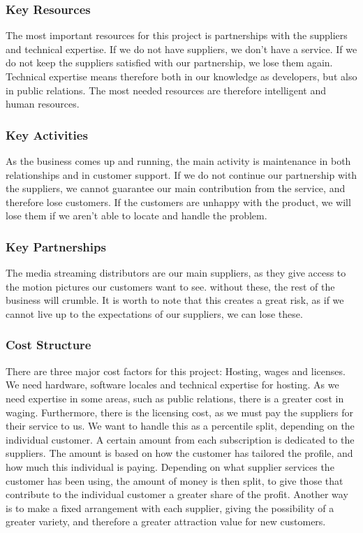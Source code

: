 \subsubsection*{Key Resources}
The most important resources for this project is partnerships with the suppliers and technical expertise. If we do not have suppliers, we don't have a service. If we do not keep the suppliers satisfied with our partnership, we lose them again. Technical expertise means therefore both in our knowledge as developers, but also in public relations. The most needed resources are therefore intelligent and human resources.

\subsubsection*{Key Activities}
As the business comes up and running, the main activity is maintenance in both relationships and in customer support. If we do not continue our partnership with the suppliers, we cannot guarantee our main contribution from the service, and therefore lose customers. If the customers are unhappy with the product, we will lose them if we aren't able to locate and handle the problem.

\subsubsection*{Key Partnerships}
The media streaming distributors are our main suppliers, as they give access to the motion pictures our customers want to see. without these, the rest of the business will crumble. It is worth to note that this creates a great risk, as if we cannot live up to the expectations of our suppliers, we can lose these.

\subsubsection*{Cost Structure}
There are three major cost factors for this project: Hosting, wages and licenses. We need hardware, software locales and technical expertise for hosting. As we need expertise in some areas, such as public relations, there is a greater cost in waging. Furthermore, there is the licensing cost, as we must pay the suppliers for their service to us. We want to handle this as a percentile split, depending on the individual customer. A certain amount from each subscription is dedicated to the suppliers. The amount is based on how the customer has tailored the profile, and how much this individual is paying. Depending on what supplier services the customer has been using, the amount of money is then split, to give those that contribute to the individual customer a greater share of the profit. Another way is to make a fixed arrangement with each supplier, giving the possibility of a greater variety, and therefore a greater attraction value for new customers.